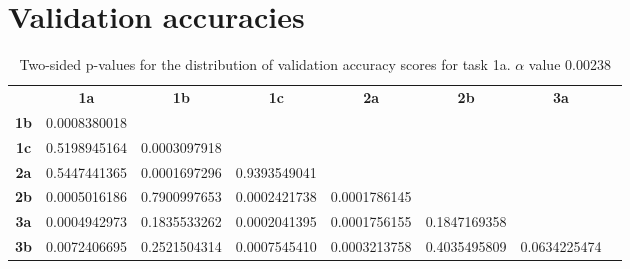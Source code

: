 \section{Validation accuracies}
\label{appendix:ptable.accuracy}

\begin{table}[h!]
    \centering
    \begin{tabular}{cccccccc}
                              & \textbf{1a}        & \textbf{1b}        & \textbf{1c}        & \textbf{2a}        & \textbf{2b}  & \textbf{3a}  \\
    \textbf{1b}               & 0.0008380018       &                    &                    &                    &              &              \\
    \textbf{1c}               & 0.5198945164       & 0.0003097918       &                    &                    &              &              \\
    \textbf{2a}               & 0.5447441365       & 0.0001697296       & 0.9393549041       &                    &              &              \\
    \textbf{2b}               & 0.0005016186       & 0.7900997653       & 0.0002421738       &  0.0001786145      &              &              \\
    \textbf{3a}               & 0.0004942973       & 0.1835533262       & 0.0002041395       &  0.0001756155      & 0.1847169358 &              \\
    \textbf{3b}               & 0.0072406695       & 0.2521504314       & 0.0007545410       &  0.0003213758      & 0.4035495809 & 0.0634225474 
    \end{tabular}
    \caption{Two-sided p-values for the distribution of validation accuracy scores for task 1a. \(\alpha\) value 0.00238}
    \label{tab:exp2.validation1a}
\end{table}

